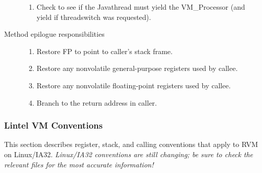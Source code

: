 \begin{description}
\begin{enumerate}
\item Check to see if the Java\trademark thread must yield the VM\_Processor
(and yield if threadswitch was requested). 
\end{enumerate}

\item [Method epilogue responsibilities]

\begin{enumerate}
\item Restore FP to point to caller's stack frame.

\item Restore any nonvolatile general-purpose registers used by callee.

\item Restore any nonvolatile floating-point registers used by callee.

\item Branch to the return address in caller.
\end{enumerate}
\end{description}

\subsubsection{Lintel VM Conventions} \label{lintel-conventions}

This section describes register, stack, and calling conventions that
apply to RVM on Linux/IA32.  {\em Linux/IA32 conventions are still
changing; be sure to check the relevant files for the most accurate
information!}



